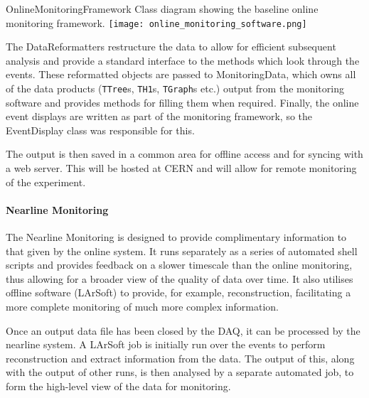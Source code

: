 \begin{cdrfigure}{OnlineMonitoringFramework}{
    Class diagram showing the baseline online monitoring framework. 
    }
  \texttt{[image: online\_monitoring\_software.png]}
\end{cdrfigure}

The DataReformatters restructure the data to allow for efficient subsequent
analysis and provide a standard interface to the methods which look through
the events.  These reformatted objects are passed to MonitoringData, which
owns all of the data products (\texttt{TTree}s, \texttt{TH1}s, \texttt{TGraph}s
etc.) output from the monitoring software and provides methods for filling
them when required.  Finally, the online event displays are
written as part of the monitoring framework, so the EventDisplay class was
responsible for this.  

The output is then saved in a common area for offline access and for syncing
with a web server. This will be hosted at CERN and will allow for remote
monitoring of the experiment.

\paragraph{Nearline Monitoring}

The Nearline Monitoring is designed to provide complimentary information to
that given by the online system. It runs separately as a series of automated
shell scripts and provides feedback on a slower timescale than the online
monitoring, thus allowing for a broader view of the quality of data over time.
It also utilises offline software (LArSoft) to provide, for example,
reconstruction, facilitating a more complete monitoring of much more complex
information.

Once an output data file has been closed by the DAQ, it can be processed by the
nearline system.  A LArSoft job is initially run over the events to perform
reconstruction and extract information from the data.  The output of this,
along with the output of other runs, is then analysed by a separate automated
job, to form the high-level view of the data for monitoring.

